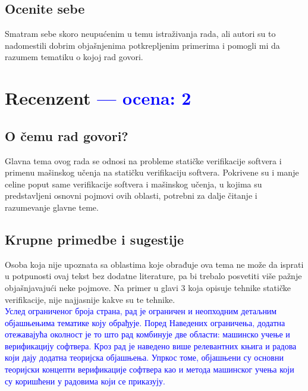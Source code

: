\documentclass[a4paper]{report}
\newcommand{\odgovor}[1]{\textcolor{blue}{#1}}
\begin{document}
\section{Ocenite sebe}
Smatram sebe skoro neupućenim u temu istraživanja rada, ali autori su to nadomestili dobrim objašnjenima potkrepljenim primerima i pomogli mi da razumem tematiku o kojoj rad govori.

\chapter{Recenzent \odgovor{--- ocena: 2} }


\section{O čemu rad govori?}
Glavna tema ovog rada se odnosi na probleme statičke verifikacije softvera i primenu mašinskog učenja na statičku verifikaciju softvera. Pokrivene su i manje celine poput same verifikacije softvera i mašinskog učenja, u kojima su predstavljeni osnovni pojmovi ovih oblasti, potrebni za dalje čitanje i razumevanje glavne teme.

\section{Krupne primedbe i sugestije}
Osoba koja nije upoznata sa oblastima koje obrađuje ova tema ne može da isprati u potpunosti ovaj tekst bez dodatne literature, pa bi trebalo posvetiti više pažnje objašnjavajući neke pojmove. Na primer u glavi 3 koja opisuje tehnike statičke verifikacije, nije najjasnije kakve su te tehnike.
\\

\odgovor{Услед ограниченог броја страна, рад је ограничен и неопходним детаљним објашњењима тематике коју обрађује. Поред Наведених ограничења, додатна отежавајућа околност је то што рад комбинује две области: машинско учење и верификацију софтвера. Кроз рад је наведено више релевантних књига и радова који дају додатна теоријска објашњења. Упркос томе, објашњени су основни теоријски концепти верификације софтвера као и метода машинског учења који су коришћени у радовима који се приказују.}
\end{document}
